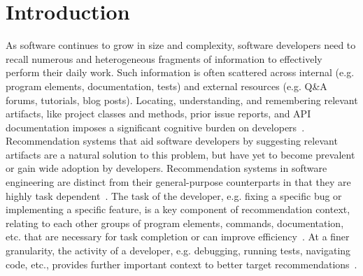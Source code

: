 



\section{Introduction}

As software continues to grow in size and complexity, software developers need to recall numerous and heterogeneous
fragments of information to effectively perform their daily work. Such information is often scattered across internal (e.g. program
elements, documentation, tests) and external resources (e.g. Q\&A forums, tutorials, blog posts).
Locating, understanding, and remembering relevant artifacts, like project classes and methods,
prior issue reports, and API documentation imposes a significant cognitive burden on
developers~\cite{ko_information_2007,ko_howdevs_2006,robillard2015recommending}.  Recommendation systems that aid
software developers by suggesting relevant artifacts are a natural solution to this problem, but have yet
to become prevalent or gain wide adoption by developers. Recommendation systems in software engineering are distinct from their general-purpose counterparts in that they are highly task dependent~\cite{robillard2014recommendation,zou2012industrial,coman2008automated}. The task of the developer, e.g. fixing a specific bug or implementing a specific feature, is a key component of recommendation context, relating to each other groups of program elements, commands, documentation, etc. that are necessary for task completion or can improve
efficiency~\cite{gasparic,ying_task}. At a finer granularity, the activity of a developer, e.g. debugging, running tests, navigating code, etc., provides
further important context to better target recommendations~\cite{kevic,meyer2017work}.

